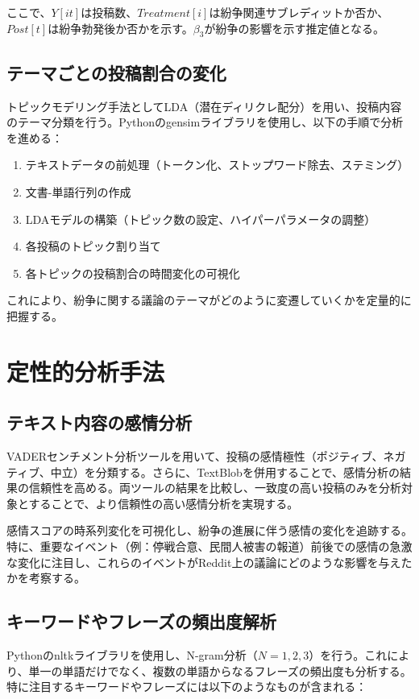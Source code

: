 \documentclass[11pt, a4j]{jreport}
\begin{document}
    ここで、$Y[it]$は投稿数、$Treatment[i]$は紛争関連サブレディットか否か、$Post[
    t]$は紛争勃発後か否かを示す。$β_{3}$が紛争の影響を示す推定値となる。

    \subsection{テーマごとの投稿割合の変化}
    トピックモデリング手法としてLDA（潜在ディリクレ配分）を用い、投稿内容のテーマ分類を行う。Pythonのgensimライブラリを使用し、以下の手順で分析を進める：

    \begin{enumerate}
        \item テキストデータの前処理（トークン化、ストップワード除去、ステミング）

        \item 文書-単語行列の作成

        \item LDAモデルの構築（トピック数の設定、ハイパーパラメータの調整）

        \item 各投稿のトピック割り当て

        \item 各トピックの投稿割合の時間変化の可視化
    \end{enumerate}

    これにより、紛争に関する議論のテーマがどのように変遷していくかを定量的に把握する。

    \section{定性的分析手法}
    \subsection{テキスト内容の感情分析}
    VADERセンチメント分析ツールを用いて、投稿の感情極性（ポジティブ、ネガティブ、中立）を分類する。さらに、TextBlobを併用することで、感情分析の結果の信頼性を高める。両ツールの結果を比較し、一致度の高い投稿のみを分析対象とすることで、より信頼性の高い感情分析を実現する。

    感情スコアの時系列変化を可視化し、紛争の進展に伴う感情の変化を追跡する。特に、重要なイベント（例：停戦合意、民間人被害の報道）前後での感情の急激な変化に注目し、これらのイベントがReddit上の議論にどのような影響を与えたかを考察する。

    \subsection{キーワードやフレーズの頻出度解析}
    Pythonのnltkライブラリを使用し、N-gram分析（$N=1,2,3$）を行う。これにより、単一の単語だけでなく、複数の単語からなるフレーズの頻出度も分析する。特に注目するキーワードやフレーズには以下のようなものが含まれる：
\end{document}
